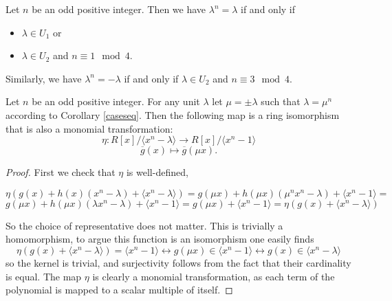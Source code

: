 \documentclass[10pt,a4paper]{amsart}
\newcommand{\id}[1]{\langle #1 \rangle}
\newcommand{\lm}{\lambda}
\begin{document}
\begin{corollary}\label{caseseq}
    Let $n$ be an odd positive integer. Then we have $\lm^n = \lm$ if and only if 
    \begin{itemize}
        \item $\lm \in U_1$ or
        \item $\lm \in U_2$ and $n \equiv 1 \mod 4$.
    \end{itemize}
         Similarly, we have  $\lm^n = -\lm$ if and only if $\lm \in U_2$ and $n \equiv 3 \mod 4$.
   
\end{corollary}

\begin{proposition}\label{equivalencesR}
    Let $n$ be an odd positive integer. For any unit $\lm$ let $\mu = \pm \lm$ such that $\lm = \mu^n$ according to Corollary \ref{caseseq}. Then the following map is a ring isomorphism that is also a monomial transformation:
    \[\eta: R[x]/\langle x^n-\lm \rangle \to R[x]/\langle x^n- 1 \rangle\]
        \[\overline g(x) \mapsto \overline g(\mu x).\]
        

    
\end{proposition}

\begin{proof}
    First we check that $\eta$ is well-defined,

\[\eta(g(x) + h(x)(x^n-\lm) + \langle x^n - \lm \rangle) = g(\mu x) + h(\mu x)(\mu ^n x^{n}-\lm) + \langle x^n -1\rangle =\]
\[g(\mu x) + h(\mu x)(\lm x^n -\lm) + \langle x^n - 1 \rangle =
g(\mu x) + \langle x^n - 1 \rangle = \eta(g(x) + \langle x^n - \lm \rangle)\]

So the choice of representative does not matter.
This is trivially a homomorphism, to argue this function is an isomorphism one easily finds
\[\eta(g(x) + \id{x^n-\lm}) = \id{x^n-1} \leftrightarrow g(\mu x) \in \id{x^n-1} \leftrightarrow g(x) \in \id{x^n-\lm}\]
so the kernel is trivial, and surjectivity follows from the fact that their cardinality is equal.
The map $\eta$ is clearly a monomial transformation, as each term of the polynomial is mapped to a scalar multiple of itself.



\end{proof}
\end{document}
